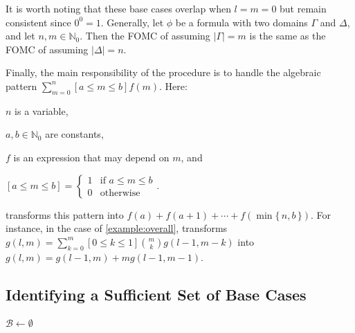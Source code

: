 \documentclass[letterpaper]{article} %
\theoremstyle{remark}
\theoremstyle{definition}
\begin{document}
It is worth noting that these base cases overlap when $l = m = 0$ but remain
consistent since $0^{0} = 1$. Generally, let $\phi$ be a formula with two
domains $\Gamma$ and $\Delta$, and let $n, m \in \mathbb{N}_{0}$. Then the FOMC
of  assuming $|\Gamma| = m$ is the same as the
FOMC of  assuming $|\Delta| = n$.

Finally, the main responsibility of the \Simplify procedure is to handle the
algebraic pattern $\sum_{m=0}^{n}[a \le m \le b] f(m)$. Here:
\begin{enumerate*}[label=(\roman*)]
  \item $n$ is a variable,
  \item $a, b \in \mathbb{N}_{0}$ are constants,
  \item $f$ is an expression that may depend on $m$, and
  \item $[a \le m \le b] =
  \begin{cases}
    1 & \text{if $a \le m \le b$} \\
    0 & \text{otherwise}
  \end{cases}$.
\end{enumerate*}
\Simplify transforms this pattern into
$f(a) + f(a+1) + \cdots + f(\min\{\, n, b \,\})$. For instance, in the case of
\cref{example:overall}, \Simplify transforms
$g(l, m) = \sum_{k=0}^{m}[0 \le k \le 1]\binom{m}{k}g(l-1, m-k)$ into
$g(l, m) = g(l-1, m) + mg(l-1, m-1)$.

\subsection{Identifying a Sufficient Set of Base Cases}\label{sec:identifying}

\begin{algorithm}[t]
  \caption{\protect{}}\label{alg:findbasecases}

  $\mathcal{B} \gets \emptyset$\;
\end{algorithm}
\end{document}
